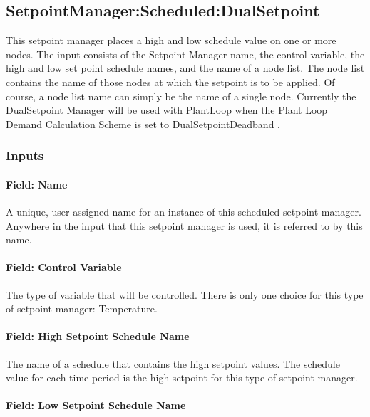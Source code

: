 \subsection{SetpointManager:Scheduled:DualSetpoint}\label{setpointmanagerscheduleddualsetpoint}

This setpoint manager places a high and low schedule value on one or more nodes. The input consists of the Setpoint Manager name, the control variable, the high and low set point schedule names, and the name of a node list. The node list contains the name of those nodes at which the setpoint is to be applied. Of course, a node list name can simply be the name of a single node. Currently the DualSetpoint Manager will be used with PlantLoop when the Plant Loop Demand Calculation Scheme is set to DualSetpointDeadband .

\subsubsection{Inputs}\label{inputs-1-040}

\paragraph{Field: Name}\label{field-name-1-039}

A unique, user-assigned name for an instance of this scheduled setpoint manager. Anywhere in the input that this setpoint manager is used, it is referred to by this name.

\paragraph{Field: Control Variable}\label{field-control-variable-1}

The type of variable that will be controlled. There is only one choice for this type of setpoint manager: Temperature.

\paragraph{Field: High Setpoint Schedule Name}\label{field-high-setpoint-schedule-name}

The name of a schedule that contains the high setpoint values. The schedule value for each time period is the high setpoint for this type of setpoint manager.

\paragraph{Field: Low Setpoint Schedule Name}\label{field-low-setpoint-schedule-name}

